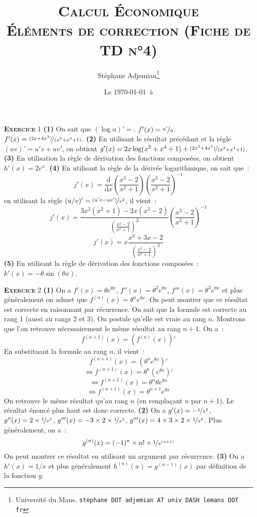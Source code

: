 \documentclass[10pt,a4paper,notitlepage]{article}
\newcommand{\exercice}[1]{\textsc{\textbf{Exercice}} #1}
\begin{document}
\title{\textsc{Calcul Économique\\ \small{Éléments de correction (Fiche de TD n°4)}}}
\author{Stéphane Adjemian\thanks{Université du Mans. \texttt{stephane DOT adjemian AT univ DASH lemans DOT fr}}}
\date{Le \today\ à \thistime}

\maketitle

\exercice{1} \textbf{(1)} On sait que $(\log u)' = $. $f'(x) =
\nicefrac{u'}{u}$. $f'(x) =
\nicefrac{(2x+4x^3)}{(x^2+x^4+1)}$. \textbf{(2)} En utilisant le
résultat précédant et la règle $(uv)'=u'v+uv'$, on obtient $g'(x) =
2x\log(x^2+x^4+1)+\nicefrac{(2x^3+4x^5)}{(x^2+x^4+1)}$. \textbf{(3)}
En utilisation la règle de dérivation des fonctions composées, on
obtient $h'(x) = 2e^x$. \textbf{(4)} En utilisant la règle de la
dérivée logarithmique, on sait que :
\[
j'(x) = \frac{\mathrm d}{\mathrm dx}\left(\frac{x^3-2}{x^2+1}\right)\left(\frac{x^3-2}{x^2+1}\right)^{-1}
\]
en utilisant la règle $(u/v)' = \nicefrac{(u'v-uv')}{v^2}$, il vient :
\[
j'(x) = \frac{3x^2(x^2+1)-2x(x^3-2)}{\left(\frac{x^3-2}{x^2+1}\right)^2}\left(\frac{x^3-2}{x^2+1}\right)^{-1}
\]
\[
j'(x) = x\frac{x^3+3x-2}{\left(\frac{x^3-2}{x^2+1}\right)^3}
\]
\textbf{(5)} En utilisant la règle de dérivation des fonctions
composées : $k'(x) = -\theta\sin(\theta x)$.

\bigskip

\exercice{2} \textbf{(1)} On a $f'(x) = \theta e^{\theta x}$, $f''(x)
= \theta^2 e^{\theta x}$, $f'''(x) = \theta^3 e^{\theta x}$ et plus généralement
on admet que $f^{(n)}(x) = \theta^n e^{\theta x}$. On peut montrer
que ce résultat est correcte en raisonnant par récurrence. On sait que
la formule est correcte au rang 1 (aussi au rangs 2 et 3). On postule qu'elle est
vraie au rang $n$. Montrons que l'on retrouve nécessairement le même
résultat au rang $n+1$. On a :
\[
f^{(n+1)}(x) = \left(f^{(n)}(x)\right)'
\]
En substituant la formule au rang $n$, il vient :
\[
f^{(n+1)}(x) = \left(\theta^n e^{\theta x}\right)'
\]
\[
\Leftrightarrow f^{(n+1)}(x) = \theta^n \left( e^{\theta x}\right)'
\]
\[
\Leftrightarrow f^{(n+1)}(x) = \theta^n \theta e^{\theta x}
\]
\[
\Leftrightarrow f^{(n+1)}(x) = \theta^{n+1} e^{\theta x}
\]
On retrouve le même résultat qu'au rang $n$ (en remplaçant $n$ par
$n+1$). Le résultat énoncé plus haut est donc correcte. \textbf{(2)}
On a $g'(x) = -\nicefrac{1}{x^2}$, $g''(x) = 2 \times \nicefrac{1}{x^3}$,
$g'''(x) = -3 \times 2 \times\nicefrac{1}{x^4}$, $g'''(x) = 4\times 3
\times 2 \times \nicefrac{1}{x^5}$. Plus généralement, on a :
\[
g^{(n)}(x) = (-1)^n \times n! \times \nicefrac{1}{x^{(n+1)}}
\]
On peut montrer ce résultat en utilisant un argument par
récurrence. \textbf{(3)} On a $h'(x) = 1/x$ et plus généralement
$h^{(n)}(x) = g^{(n-1)}(x)$ par définition de la fonction $g$.
\end{document}
